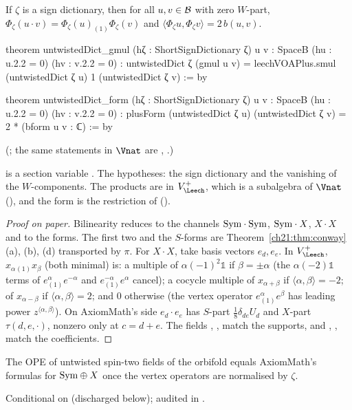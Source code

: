 \begin{theorem}\label{ch21:thm:untwisted}
If $\zeta$ is a sign dictionary, then for all $u,v\in\mathcal{B}$ with zero $W$-part,
$\Phi_\zeta(u\cdot v)=\Phi_\zeta(u)_{(1)}\Phi_\zeta(v)$ and $\langle\Phi_\zeta u,\Phi_\zeta v\rangle=2\,b(u,v)$.
\end{theorem}
\begin{leancode}
theorem untwistedDict_gmul (hζ : ShortSignDictionary ζ) {u v : SpaceB} (hu : u.2.2 = 0)
    (hv : v.2.2 = 0) :
    untwistedDict ζ (gmul u v) = leechVOAPlus.smul (untwistedDict ζ u) 1 (untwistedDict ζ v) := by
\end{leancode}
\begin{leancode}
theorem untwistedDict_form (hζ : ShortSignDictionary ζ) {u v : SpaceB} (hu : u.2.2 = 0)
    (hv : v.2.2 = 0) :
    plusForm (untwistedDict ζ u) (untwistedDict ζ v) = 2 * (bform u v : ℂ) := by
\end{leancode}
(; the same statements in $\Vnat$ are
, .)
\begin{dictionary}
 is a section variable .  The
hypotheses: the sign dictionary and the vanishing of the $W$-components.  The products are in
$V_\Leech^+$, which is a subalgebra of $\Vnat$ (), and the form 
is the restriction of  ().
\end{dictionary}
\begin{proof}[Proof on paper]
Bilinearity reduces to the channels $\mathrm{Sym}\cdot\mathrm{Sym}$, $\mathrm{Sym}\cdot X$, $X\cdot X$ and to the forms.  The first two and
the $S$-forms are Theorem~\ref{ch21:thm:conway} (a), (b), (d) transported by $\pi$.  For $X\cdot X$, take
basis vectors $e_d,e_e$.  In $V_\Leech^+$, $x_{\alpha}{}_{(1)}x_\beta$ (both minimal) is: a multiple of
$\alpha(-1)^2\mathbb1$ if $\beta=\pm\alpha$ (the $\alpha(-2)\mathbb1$ terms of
$e^\alpha_{(1)}e^{-\alpha}$ and $e^{-\alpha}_{(1)}e^{\alpha}$ cancel); a cocycle multiple of
$x_{\alpha+\beta}$ if $\langle\alpha,\beta\rangle=-2$; of $x_{\alpha-\beta}$ if $\langle\alpha,\beta\rangle=2$;
and $0$ otherwise (the vertex operator $e^\alpha_{(1)}e^\beta$ has leading power
$z^{\langle\alpha,\beta\rangle}$).  On AxiomMath's side $e_d\cdot e_e$ has $S$-part $\tfrac18\delta_{de}U_d$ and
$X$-part $\tau(d,e,\cdot)$, nonzero only at $c=d+e$.  The fields , ,
 match the supports, and , ,  match the
coefficients.
\end{proof}
\begin{physics}
The OPE of untwisted spin-two fields of the orbifold equals AxiomMath's formulas for $\mathrm{Sym}\oplus X$ once
the vertex operators are normalised by $\zeta$.
\end{physics}
\begin{status}
Conditional on  (discharged below); audited in
.
\end{status}

